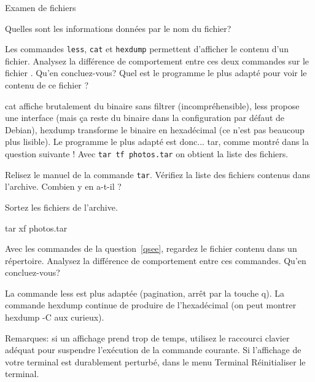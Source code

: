 \begin{exercice}
  \begin{exercicelet}{Examen de fichiers}
    \begin{questions}
    \item Quelles sont les informations données par le nom du fichier?
    \item\label{qsee} Les commandes \texttt{less}, \texttt{cat} et \texttt{hexdump} permettent
      d'afficher le contenu d'un fichier. Analysez la différence de
      comportement entre ces deux commandes sur le fichier
      . Qu'en concluez-vous? Quel est le programme le
      plus adapté pour voir le contenu de ce fichier ?
      \begin{correction}
        cat affiche brutalement du binaire sans filtrer
        (incompréhensible), less propose une interface (mais ça reste du
        binaire dans la configuration par défaut de Debian), hexdump
        transforme le binaire en hexadécimal (ce n'est pas beaucoup plus
        lisible). Le programme le plus adapté est donc... tar, comme
        montré dans la question suivante ! Avec \texttt{tar tf
          photos.tar} on obtient la liste des fichiers.
      \end{correction}
    \item Relisez le manuel de la commande \texttt{tar}. Vérifiez la
      liste des fichiers contenus dans l'archive. Combien y en a-t-il ?
    \item Sortez les fichiers de l'archive.
      \begin{correction}
        tar xf photos.tar
      \end{correction}
    \item Avec les commandes de la question~\ref{qsee}, regardez le
      fichier contenu dans un répertoire. Analysez la différence de
      comportement entre ces commandes. Qu'en concluez-vous?
      \begin{correction}
        La commande less est plus adaptée (pagination, arrêt par la
        touche q). La commande hexdump continue de produire de
        l'hexadécimal (on peut montrer hexdump -C aux curieux).
      \end{correction}
    \end{questions}
    
    Remarques: si un affichage prend trop de temps, utilisez le
    raccourci clavier adéquat pour suspendre l'exécution de la commande
    courante.  Si l'affichage de votre terminal est durablement
    perturbé, dans le menu Terminal \textrightarrow Réinitialiser le
    terminal.
  \end{exercicelet}
\end{exercice}
